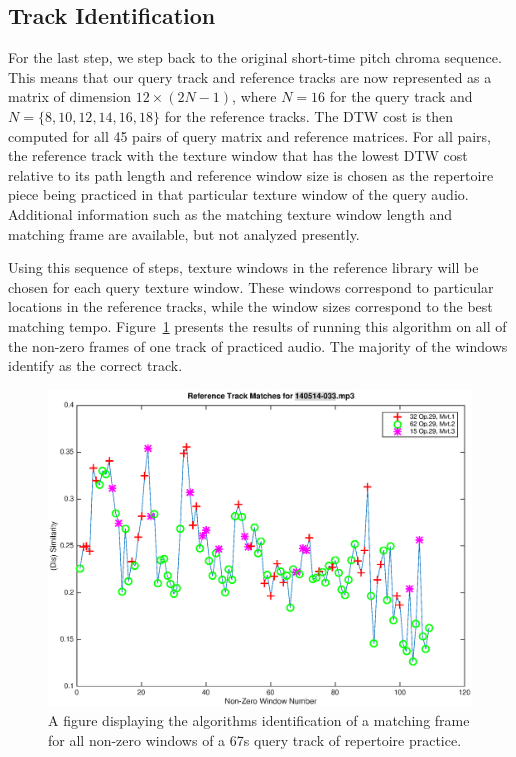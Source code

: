 \documentclass{article}
\begin{document}
\subsection{Track Identification}
\label{sec:DTW}
For the last step, we step back to the original short-time pitch chroma sequence. This means that our query track and reference tracks are now represented as a matrix of dimension $12\times (2N-1)$, where $N=16$ for the query track and $N=\{8,10,12,14,16,18\}$ for the reference tracks.
%
The DTW cost is then computed for all 45 pairs of query matrix and reference matrices. For all pairs, the reference track with the texture window that has the lowest DTW cost relative to its path length and reference window size 
is chosen as the repertoire piece being practiced in that particular texture window of the query audio.  Additional information such as the matching texture window length and matching frame are available, but not analyzed presently. 

Using this sequence of steps, texture windows in the reference library will be chosen for each query texture window. These windows correspond to particular locations in the reference tracks, while the window sizes correspond to the best matching tempo. 
Figure~\ref{fig:140514-013} 
presents the results of running this algorithm on all of the non-zero frames of one track of practiced audio. The majority of the windows identify as the correct track.

\begin{figure}
\includegraphics[width=\linewidth]{figs/140514-033.eps}
\caption{A figure displaying the algorithms identification of a matching frame for all non-zero windows of a 67s query track of repertoire practice.}
\label{fig:140514-013}
\end{figure}
\end{document}

